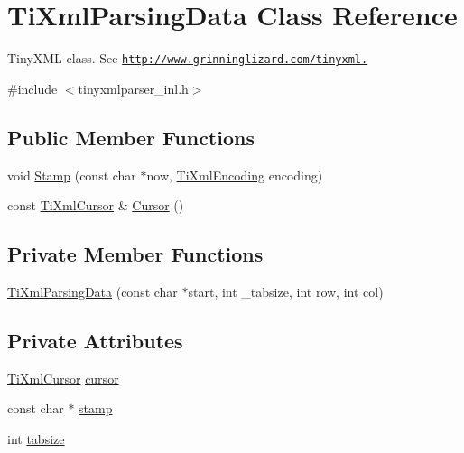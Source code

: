 \hypertarget{class_ti_xml_parsing_data}{
\section{TiXmlParsingData Class Reference}
\label{class_ti_xml_parsing_data}
}


TinyXML class. See \href{http://www.grinninglizard.com/tinyxml.}{\tt http://www.grinninglizard.com/tinyxml.}  


{\ttfamily \#include $<$tinyxmlparser\_\-inl.h$>$}\subsection*{Public Member Functions}
\begin{DoxyCompactItemize}
\item 
void \hyperlink{class_ti_xml_parsing_data_a65cee8ab77a36c605db08c84b4c30a7d}{Stamp} (const char $\ast$now, \hyperlink{tinyxml_8h_a88d51847a13ee0f4b4d320d03d2c4d96}{TiXmlEncoding} encoding)
\item 
const \hyperlink{struct_ti_xml_cursor}{TiXmlCursor} \& \hyperlink{class_ti_xml_parsing_data_a56908a17d7d7a6b2e511e62cf1d40d05}{Cursor} ()
\end{DoxyCompactItemize}
\subsection*{Private Member Functions}
\begin{DoxyCompactItemize}
\item 
\hyperlink{class_ti_xml_parsing_data_aa5beaf71579a91d6942277f417899ab9}{TiXmlParsingData} (const char $\ast$start, int \_\-tabsize, int row, int col)
\end{DoxyCompactItemize}
\subsection*{Private Attributes}
\begin{DoxyCompactItemize}
\item 
\hyperlink{struct_ti_xml_cursor}{TiXmlCursor} \hyperlink{class_ti_xml_parsing_data_abee4c6c657f595182a4f8beda4fa1c7d}{cursor}
\item 
const char $\ast$ \hyperlink{class_ti_xml_parsing_data_a0e3c2ea5a8b738d733735ca0318fe4ff}{stamp}
\item 
int \hyperlink{class_ti_xml_parsing_data_ab9d6aea2833e38aaef440e49c22a05ca}{tabsize}
\end{DoxyCompactItemize}
